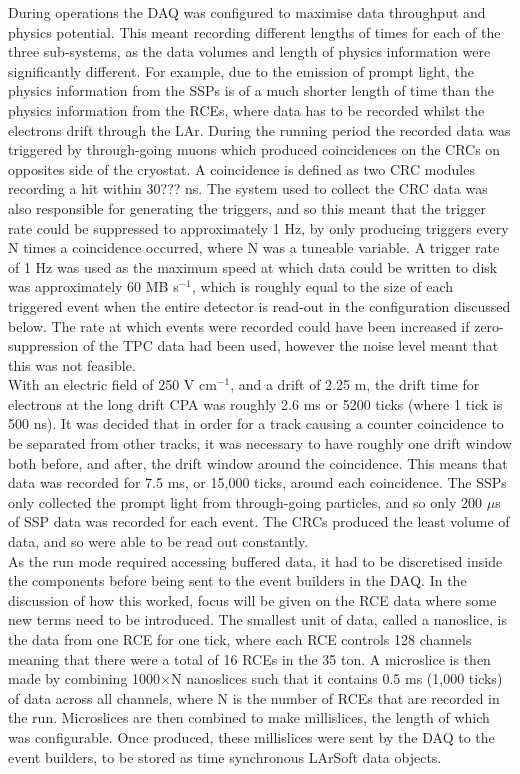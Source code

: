 During operations the DAQ was configured to maximise data throughput and physics potential. This meant recording different lengths of times for each of the three sub-systems, as the data volumes and length of physics information were significantly different. For example, due to the emission of prompt light, the physics information from the SSPs is of a much shorter length of time than the physics information from the RCEs, where data has to be recorded whilst the electrons drift through the LAr. During the running period the recorded data was triggered by through-going muons which produced coincidences on the CRCs on opposites side of the cryostat. A coincidence is defined as two CRC modules recording a hit within 30??? ns. The system used to collect the CRC data was also responsible for generating the triggers, and so this meant that the trigger rate could be suppressed to approximately 1 Hz, by only producing triggers every N times a coincidence occurred, where N was a tuneable variable. A trigger rate of 1 Hz was used as the maximum speed at which data could be written to disk was approximately 60 MB s$^{-1}$, which is roughly equal to the size of each triggered event when the entire detector is read-out in the configuration discussed below. The rate at which events were recorded could have been increased if zero-suppression of the TPC data had been used, however the noise level meant that this was not feasible. \\ 

With an electric field of 250 V cm$^{-1}$, and a drift of 2.25 m, the drift time for electrons at the long drift CPA was roughly 2.6 ms or 5200 ticks (where 1 tick is 500 ns). It was decided that in order for a track causing a counter coincidence to be separated from other tracks, it was necessary to have roughly one drift window both before, and after, the drift window around the coincidence. This means that data was recorded for 7.5 ms, or 15,000 ticks, around each coincidence. The SSPs only collected the prompt light from through-going particles, and so only 200 $\mu$s of SSP data was recorded for each event. The CRCs produced the least volume of data, and so were able to be read out constantly. \\

As the run mode required accessing buffered data, it had to be discretised inside the components before being sent to the event builders in the DAQ. In the discussion of how this worked, focus will be given on the RCE data where some new terms need to be introduced. The smallest unit of data, called a nanoslice, is the data from one RCE for one tick, where each RCE controls 128 channels meaning that there were a total of 16 RCEs in the 35 ton. A microslice is then made by combining 1000$\times$N nanoslices such that it contains 0.5 ms (1,000 ticks) of data across all channels, where N is the number of RCEs that are recorded in the run. Microslices are then combined to make millislices, the length of which was configurable. Once produced, these millislices were sent by the DAQ to the event builders, to be stored as time synchronous LArSoft data objects. \\

